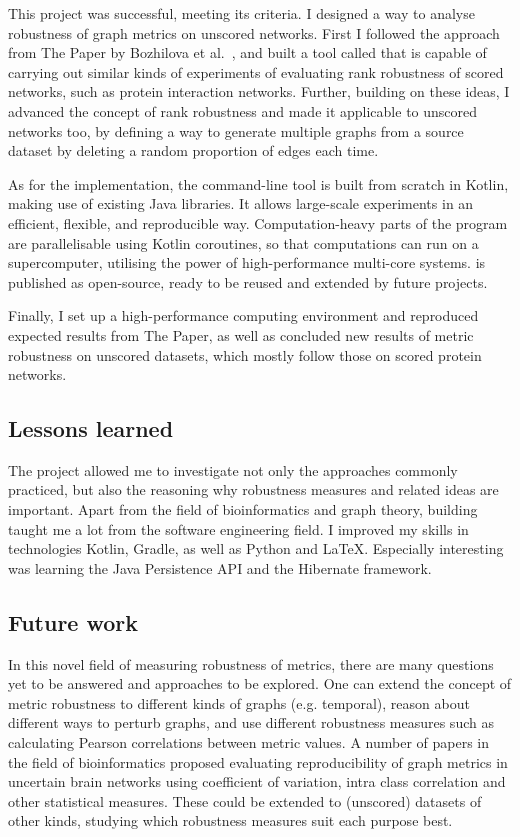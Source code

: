 This project was successful, meeting its criteria.
I designed a way to analyse robustness of graph metrics on unscored networks.
First I followed the approach from The Paper by Bozhilova et al.~\cite{Bozhilova2019}, and built a tool called \graffs that is capable of carrying out similar kinds of experiments of evaluating rank robustness of scored networks, such as protein interaction networks.
Further, building on these ideas, I advanced the concept of rank robustness and made it applicable to unscored networks too, by defining a way to generate multiple graphs from a source dataset by deleting a random proportion of edges each time.

As for the implementation, the command-line tool \graffs is built from scratch in Kotlin, making use of existing Java libraries.
It allows large-scale experiments in an efficient, flexible, and reproducible way.
Computation-heavy parts of the program are parallelisable using Kotlin coroutines, so that computations can run on a supercomputer, utilising the power of high-performance multi-core systems.
\graffs is published as open-source, ready to be reused and extended by future projects.

Finally, I set up a high-performance computing environment and reproduced expected results from The Paper, as well as concluded new results of metric robustness on unscored datasets, which mostly follow those on scored protein networks.


\subsection*{Lessons learned}

The project allowed me to investigate not only the approaches commonly practiced, but also the reasoning why robustness measures and related ideas are important.
Apart from the field of bioinformatics and graph theory, building \graffs taught me a lot from the software engineering field.
I improved my skills in technologies Kotlin, Gradle, as well as Python and LaTeX.
Especially interesting was learning the Java Persistence API and the Hibernate framework.


\subsection*{Future work}

In this novel field of measuring robustness of metrics, there are many questions yet to be answered and approaches to be explored.
One can extend the concept of metric robustness to different kinds of graphs (e.g. temporal), reason about different ways to perturb graphs, and use different robustness measures such as calculating Pearson correlations between metric values.
A number of papers in the field of bioinformatics proposed evaluating reproducibility of graph metrics in uncertain brain networks using coefficient of variation, intra class correlation and other statistical measures.
These could be extended to (unscored) datasets of other kinds, studying which robustness measures suit each purpose best.

